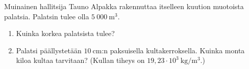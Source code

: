\begin{tehtava}
Muinainen hallitsija Tauno Alpakka rakennuttaa itselleen kuution muotoista palatsia.  Palatsin tulee olla $5\ 000\ \mathrm{m}^3$. 
\begin{enumerate}
\item Kuinka korkea palatsista tulee?
\item Palatsi päällystetään $10\ \mathrm{cm}$:n paksuisella kultakerroksella.  Kuinka monta kiloa kultaa tarvitaan? (Kullan tiheys on $19,23 \cdot 10^3\ \mathrm{ kg}/\mathrm{m}^3$.)
\end{enumerate}
\end{tehtava}

